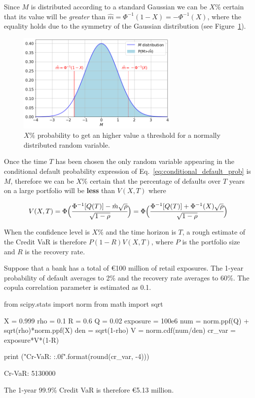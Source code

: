 Since $M$ is distributed according to a standard Gaussian we can be $X\%$ certain that its value will be \emph{greater} than $\hat{m} = \Phi^{-1}(1-X)=-\Phi^{-1}(X)$, where the equality holds due to the symmetry of the Gaussian distribution (see Figure~\ref{fig:certain_for_X}).

\begin{figure}[htb]
\centering
\includegraphics[width=0.7\textwidth]{figures/certain_for_X}
\caption{$X\%$ probability to get an higher value a threshold for a normally distributed random variable.}
\label{fig:certain_for_X}
\end{figure} 

Once the time $T$ has been chosen the only random variable appearing in the conditional default probability expression of Eq.~\ref{eq:conditional_default_prob} is $M$, therefore we can be $X\%$ certain that the percentage of defaults over $T$ years on a large portfolio will be \textbf{less} than $V(X,T)$ where

\begin{equation*}
V(X,T)= \Phi\Big(\cfrac{\Phi^{-1}[Q(T)]-\hat{m}\sqrt{\rho}}{\sqrt{1-\rho}}\Big) = \Phi\Big(\cfrac{\Phi^{-1}[Q(T)]+\Phi^{-1}(X)\sqrt{\rho}}{\sqrt{1-\rho}}\Big)
\end{equation*}

When the confidence level is $X\%$ and the time horizon is $T$, a rough estimate of the Credit VaR is therefore $P(1-R)V(X,T)$, where $P$ is the portfolio size and $R$ is the recovery rate.

Suppose that a bank has a total of \euro{100} million of retail exposures. The 1-year probability of default averages to 2\% and the recovery rate averages to 60\%. The copula correlation parameter is estimated as 0.1.

\begin{ipython}
from scipy.stats import norm
from math import sqrt

X = 0.999
rho = 0.1
R = 0.6
Q = 0.02
exposure = 100e6
num = norm.ppf(Q) + sqrt(rho)*norm.ppf(X)
den = sqrt(1-rho)
V = norm.cdf(num/den)
cr_var = exposure*V*(1-R)

print ("Cr-VaR: {:.0f}".format(round(cr_var, -4)))
\end{ipython}
\begin{ioutput}
Cr-VaR: 5130000
\end{ioutput}
\noindent
The 1-year 99.9\% Credit VaR is therefore \euro{5.13} million.

